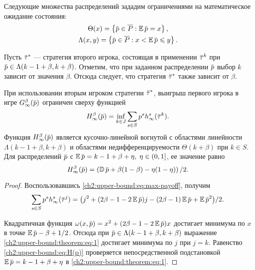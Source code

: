 {Следующие множества распределений зададим ограничениями на математическое ожидание состояния:
\begin{gather*}
  \Theta(x) = \left\{ \p \in \MM: \E \p = x \right\}, \\
  \Lambda(x, y) = \left\{ \p \in \MM: x < \E \p \leqslant y \right\}.
\end{gather*}

Пусть $\tauv^*$ --- стратегия второго игрока, состоящая в применении $\tauv^k$ при $\p \in \Lambda(k-1+\beta,k+\beta)$.
Отметим, что при заданном распределении $\p$ выбор $k$ зависит от значения $\beta$.
Отсюда следует, что стратегия $\tauv^*$ также зависит от $\beta$.

\begin{theorem}
  \label{ch2:upper-bound:theorem}
  При использовании вторым игроком стратегии $\tauv^*$, выигрыш первого игрока в игре
  $\theG[\infty](\p)$ ограничен сверху функцией
  \begin{equation*}
    \High(\p) = \inf_{k \in J} \sum_{s \in S} p^s  h^s_\infty(\tauv^k).
  \end{equation*}
  Функция $\High(\p)$ является кусочно-линейной вогнутой с областями линейности $\Lambda(k - 1 + \beta, k + \beta)$ и областями недифференцируемости $\Theta(k+\beta)$ при $k \in S$.
  Для распределений $\p$ с $\E \p = k - 1 + \beta + \eta, \; \eta \in (0, 1]$, ее значение равно
  \begin{equation}
    \label{ch2:upper-bound:eq:H(p)}
    \High(\p) = \left( \D \p + \beta(1-\beta) - \eta(1-\eta) \right)/2.
  \end{equation}
\end{theorem}
\begin{proof}
  Воспользовавшись \eqref{ch2:upper-bound:eq:max-payoff}, получим
  \begin{equation}
    \label{ch2:upper-bound:theorem:eq:1}
    \begin{gathered}
    \sum_{s \in S} p^s h^s_\infty(\tauv^j) = \bigl(
      j^2 + (2\beta - 1 - 2 \E \p)j - (2\beta - 1) \E \p + \E \p^2 
    \bigr)/2.
    \end{gathered}
  \end{equation}
  
  Квадратичная функция $\omega(x, \p) = x^2 + (2\beta - 1 - 2\E \p)x$ достигает минимума по $x$ в точке
  $\E \p - \beta + 1/2$.
  Отсюда при $\p \in \Lambda(k - 1 + \beta, k + \beta)$ выражение \eqref{ch2:upper-bound:theorem:eq:1} достигает минимума по $j$ при $j = k$.
  Равенство \eqref{ch2:upper-bound:eq:H(p)} проверяется непосредственной подстановкой $\E \p = k - 1 + \beta + \eta$ в \eqref{ch2:upper-bound:theorem:eq:1}.
\end{proof}

}
